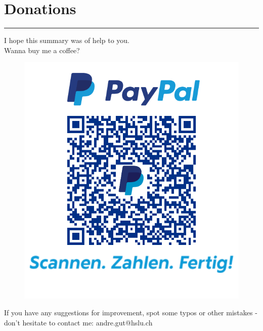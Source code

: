 \section{Donations}
\noindent\rule[\linienAbstand]{\linewidth}{\linienDickeDick}
I hope this summary was of help to you.\\
Wanna buy me a coffee?
\begin{figure}[H]
  \centering
  \includegraphics[width=0.5\linewidth]{Pics/qrcode.png}
\end{figure}
If you have any suggestions for improvement, spot some typos or other mistakes - don't hesitate to contact me: andre.gut@hslu.ch
